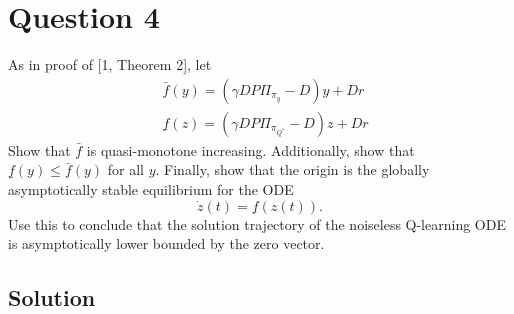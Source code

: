 \section*{Question 4}

As in proof of [1, Theorem 2], let
\[
    \begin{aligned}
         & \bar{f}(y)=\left(\gamma D P \Pi_{\pi_{y}}-D\right) y+D r           \\
         & \underline{f}(z)=\left(\gamma D P \Pi_{\pi_{Q^{*}}}-D\right) z+D r
    \end{aligned}
\]
Show that \( \bar{f} \) is quasi-monotone increasing.
Additionally, show that \( \underline{f}(y) \leq \bar{f}(y) \) for all \( y \).
Finally, show that the origin is the globally asymptotically stable equilibrium for the ODE
\[
    \dot{z}(t)=\underline{f}(z(t)) .
\]
Use this to conclude that the solution trajectory of the noiseless Q-learning ODE is asymptotically lower bounded by the zero vector.

\subsection*{Solution}
